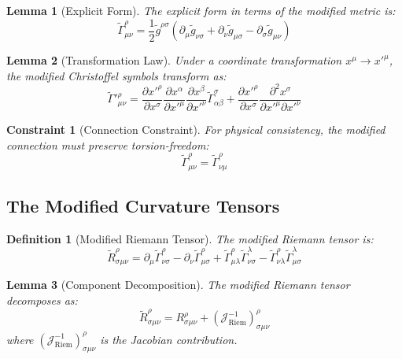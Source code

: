 \documentclass{article}
\newcommand{\tl}[1]{\tilde{#1}}
\newtheorem{lemma}{Lemma}
\newtheorem{definition}{Definition}
\newtheorem{constraint}{Constraint}
\begin{document}
\begin{lemma}[Explicit Form]
The explicit form in terms of the modified metric is:
\begin{equation}
\tl{\Gamma}^{\rho}_{\mu\nu} = \frac{1}{2}\tl{g}^{\rho\sigma}(\partial_{\mu}\tl{g}_{\nu\sigma} + \partial_{\nu}\tl{g}_{\mu\sigma} - \partial_{\sigma}\tl{g}_{\mu\nu})
\end{equation}
\end{lemma}

\begin{lemma}[Transformation Law]
Under a coordinate transformation $x^{\mu} \to x'^{\mu}$, the modified Christoffel symbols transform as:
\begin{equation}
\tl{\Gamma}'^{\rho}_{\mu\nu} = \frac{\partial x'^{\rho}}{\partial x^{\sigma}} \frac{\partial x^{\alpha}}{\partial x'^{\mu}} \frac{\partial x^{\beta}}{\partial x'^{\nu}} \tl{\Gamma}^{\sigma}_{\alpha\beta} + \frac{\partial x'^{\rho}}{\partial x^{\sigma}} \frac{\partial^2 x^{\sigma}}{\partial x'^{\mu} \partial x'^{\nu}}
\end{equation}
\end{lemma}

\begin{constraint}[Connection Constraint]
For physical consistency, the modified connection must preserve torsion-freedom:
\begin{equation}
\tl{\Gamma}^{\rho}_{\mu\nu} = \tl{\Gamma}^{\rho}_{\nu\mu}
\end{equation}
\end{constraint}

\subsection{The Modified Curvature Tensors}

\begin{definition}[Modified Riemann Tensor]
The modified Riemann tensor is:
\begin{equation}
\tl{R}^{\rho}_{\sigma\mu\nu} = \partial_{\mu}\tl{\Gamma}^{\rho}_{\nu\sigma} - \partial_{\nu}\tl{\Gamma}^{\rho}_{\mu\sigma} + \tl{\Gamma}^{\rho}_{\mu\lambda}\tl{\Gamma}^{\lambda}_{\nu\sigma} - \tl{\Gamma}^{\rho}_{\nu\lambda}\tl{\Gamma}^{\lambda}_{\mu\sigma}
\end{equation}
\end{definition}

\begin{lemma}[Component Decomposition]
The modified Riemann tensor decomposes as:
\begin{equation}
\tl{R}^{\rho}_{\sigma\mu\nu} = R^{\rho}_{\sigma\mu\nu} + (\mathcal{J}^{-1}_{\text{Riem}})^{\rho}_{\sigma\mu\nu}
\end{equation}
where $(\mathcal{J}^{-1}_{\text{Riem}})^{\rho}_{\sigma\mu\nu}$ is the Jacobian contribution.
\end{lemma}
\end{document}
